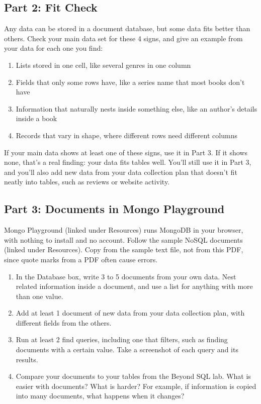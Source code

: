 \documentclass[12pt]{article}
\begin{document}
\subsection*{Part 2: Fit Check}
Any data can be stored in a document database, but some data fits better than others. Check your main data set for these 4 signs, and give an example from your data for each one you find:
\begin{enumerate}
    \item Lists stored in one cell, like several genres in one column
    \item Fields that only some rows have, like a series name that most books don't have
    \item Information that naturally nests inside something else, like an author's details inside a book
    \item Records that vary in shape, where different rows need different columns
\end{enumerate}
If your main data shows at least one of these signs, use it in Part 3. If it shows none, that's a real finding: your data fits tables well. You'll still use it in Part 3, and you'll also add new data from your data collection plan that doesn't fit neatly into tables, such as reviews or website activity.

\subsection*{Part 3: Documents in Mongo Playground}
Mongo Playground (linked under Resources) runs MongoDB in your browser, with nothing to install and no account. Follow the sample NoSQL documents (linked under Resources). Copy from the sample text file, not from this PDF, since quote marks from a PDF often cause errors.
\begin{enumerate}
    \item In the Database box, write 3 to 5 documents from your own data. Nest related information inside a document, and use a list for anything with more than one value.
    \item Add at least 1 document of new data from your data collection plan, with different fields from the others.
    \item Run at least 2 find queries, including one that filters, such as finding documents with a certain value. Take a screenshot of each query and its results.
    \item Compare your documents to your tables from the Beyond SQL lab. What is easier with documents? What is harder? For example, if information is copied into many documents, what happens when it changes?
\end{enumerate}
\end{document}
